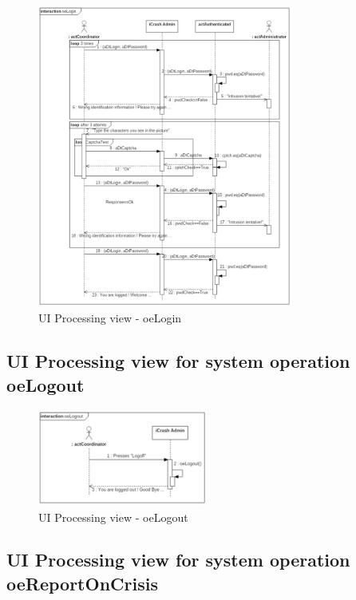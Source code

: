 \begin{figure}[h]
	\centering	
	\captionsetup{justification=centering}
	\includegraphics[width=0.75\textwidth]{./images/ui_oeLogin.eps}
	\caption{UI Processing view - oeLogin}
\end{figure}


\subsection{UI Processing view for system operation oeLogout}

\begin{figure}[h]
	\centering	
	\captionsetup{justification=centering}
	\includegraphics[width=0.5\textwidth]{./images/ui_oeLogout.eps}
	\caption{UI Processing view - oeLogout}
\end{figure}


\subsection{UI Processing view for system operation oeReportOnCrisis}

